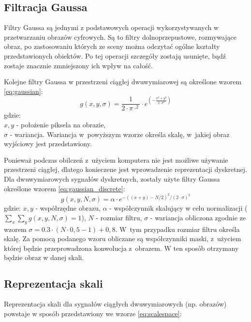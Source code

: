 \subsection{Filtracja Gaussa}
\label{subsec:filtracjaGaussa}
Filtry Gaussa są jednymi z podstawowych operacji wykorzystywanych w przetwarzaniu obrazów cyfrowych. Są to filtry dolnoprzepustowe, rozmywające obraz, po zastosowaniu których ze sceny można odczytać ogólne kształty przedstawionych obiektów. Po tej operacji szczegóły zostają usunięte, bądź zostaje znacznie zmniejszony ich wpływ na całość.

Kolejne filtry Gaussa w przestrzeni ciągłej dwuwymiarowej są określone wzorem \ref{eq:gaussian}:
\begin{equation}
\label{eq:gaussian}
g(x,y,\sigma)=\frac{1}{2 \cdot \pi \cdot ^ {2} }\cdot e^{(-\frac{x^{2} + y^{2}}{2 \cdot \sigma ^{2}})}
\end{equation}
gdzie:\\
$ x,y $ - położenie piksela na obrazie, \\
$ \sigma $ - wariancja.
\newline
Wariancja w~powyższym wzorze określa skalę, w~jakiej obraz wyjściowy jest przedstawiony. 

Ponieważ podczas obilczeń z~użyciem komputera nie jest możliwe używanie przestrzeni ciągłej, dlatego konieczene jest wprowadzenie reprezentacji dyskretnej. 
Dla dwuwymiarowych sygnałów dyskretnych, zostały użyte filtry Gaussa określone wzorem \ref{eq:gaussian_discrete}:
\begin{equation}
\label{eq:gaussian_discrete}
g(x,y,N,\sigma) = \alpha \cdot e^{-((x+y)-N/2)^2/(2 \cdot \sigma)^2}
\end{equation}
gdzie: \newline 
$ x, y$ - współrzędne obrazu, \newline
$ \alpha $ - współczynnik skalujący w celu normalizacji ($ \sum_x \sum_y g(x,y,N,\sigma) = 1 $), \newline
$ N $ - rozmiar filtru, \newline
$ \sigma $ - wariancja obliczona zgodnie ze wzorem $ \sigma = 0.3 \cdot (N \cdot 0,5 - 1) + 0,8$. \newline
W~tym przypadku rozmiar filtru określa skalę. Za pomocą podanego wzoru obliczane są współczynniki maski, z~użyciem której będzie przeprowadzona konwolucja z~obrazem. W ten sposób otrzymany będzie obraz w danej skali.

\subsection{Reprezentacja skali}
\label{subsec:reprezentacjaskali}
Reprezentacja skali dla sygnałów ciągłych dwuwymiarowych (np. obrazów) powstaje w sposób przedstawiony we wzorze \ref{eq:scalespace}:

